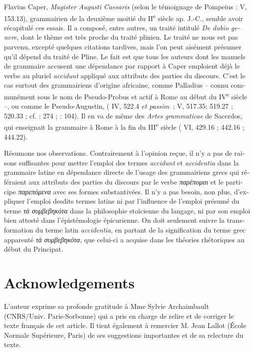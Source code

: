 \documentclass[output=paper]{langsci/langscibook}
\begin{document}
\begin{otherlanguage}{french}
Flavius Caper, \textit{Magister Augusti Caesaris} (selon le témoignage de Pompeius :  V, 153.13), grammairien de la deuxième moitié du II\textsuperscript{e} siècle ap. J.-C., semble avoir récapitulé ces essais. Il a composé, entre autres, un traité intitulé \textit{De dubio genere}, dont le thème est très proche du traité plinien. Le traité ne nous est pas parvenu, excepté quelques citations tardives, mais l’on peut aisément présumer qu’il dépend du traité de Pline. Le fait est que tous les auteurs dont les manuels de grammaire accusent une dépendance par rapport à Caper emploient déjà le verbe au pluriel \textit{accidunt} appliqué aux attributs des parties du discours. C’est le cas surtout des grammairiens d’origine africaine, comme Palladius – connu communément sous le nom de Pseudo-Probus et actif à Rome au début du IV\textsuperscript{e} siècle –, ou comme le Pseudo-Augustin, ( IV, 522.4 \textit{et passim~}; V, 517.35; 519.27 ; 520.33 ; cf. \citealt{basset_ptota_2007}: 274 ; \citeyear{mazhuga_uber_2011}: 104). Il en va de même des \textit{Artes grammaticae} de Sacerdos, qui enseignait la grammaire à Rome à la fin du III\textsuperscript{e} siècle ( VI, 429.16 ; 442.16 ; 444.22).

Résumons nos observations. Contrairement à l’opinion reçue, il n’y a pas de raisons suffisantes pour mettre l’emploi des termes \textit{accidunt} et \textit{accidentia} dans la grammaire latine en dépendance directe de l’usage des grammairiens grecs qui référaient aux attributs des parties du discours par le verbe \textit{παρέπομαι} et le participe \textit{παρεπόμενα} avec ses formes substantivées. Il n’y a pas besoin, non plus, d’expliquer l’emploi desdits termes latins ni par l’influence de l’emploi présumé du terme \textit{τὰ συμβεβηκότα} dans la philosophie stoïcienne du langage, ni par son emploi bien attesté dans l’épistémologie épicurienne. On doit seulement suivre la transformation du terme latin \textit{accidentia}, en partant de la signification du terme grec apparenté \textit{τὰ συμβεβηκότα}, que celui-ci a acquise dans les théories rhétoriques au début du Principat.

\section*{Acknowledgements}
L'auteur exprime sa profonde gratitude à Mme Sylvie Archaimbault (CNRS/Univ. Paris-Sorbonne) qui a pris en charge de relire et de corriger le texte français de cet article. Il tient également à remercier M. Jean Lallot (École Normale Supérieure, Paris) de ses suggestions importantes et de sa relecture du texte.

\printbibliography[keyword=primary,heading=FRprimary]

{\sloppy\printbibliography[heading=FRsecondary,notkeyword=primary]}
\end{otherlanguage}
\end{document}
